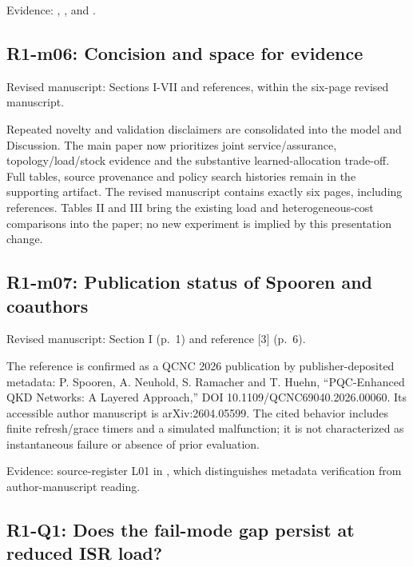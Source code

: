 Evidence: , , and .

\subsection{R1-m06: Concision and space for evidence}\label{r1-m06-concision-and-space-for-evidence}

Revised manuscript: Sections I-VII and references, within the six-page revised manuscript.

Repeated novelty and validation disclaimers are consolidated into the model and Discussion. The main paper now prioritizes joint service/assurance, topology/load/stock evidence and the substantive learned-allocation trade-off. Full tables, source provenance and policy search histories remain in the supporting artifact. The revised manuscript contains exactly six pages, including references. Tables II and III bring the existing load and heterogeneous-cost comparisons into the paper; no new experiment is implied by this presentation change.

\subsection{R1-m07: Publication status of Spooren and coauthors}\label{r1-m07-publication-status-of-spooren-and-coauthors}

Revised manuscript: Section I (p.~1) and reference {[}3{]} (p.~6).

The reference is confirmed as a QCNC 2026 publication by publisher-deposited metadata: P. Spooren, A. Neuhold, S. Ramacher and T. Huehn, ``PQC-Enhanced QKD Networks: A Layered Approach,'' DOI 10.1109/QCNC69040.2026.00060. Its accessible author manuscript is arXiv:2604.05599. The cited behavior includes finite refresh/grace timers and a simulated malfunction; it is not characterized as instantaneous failure or absence of prior evaluation.

Evidence: source-register L01 in , which distinguishes metadata verification from author-manuscript reading.

\subsection{R1-Q1: Does the fail-mode gap persist at reduced ISR load?}\label{r1-q1-does-the-fail-mode-gap-persist-at-reduced-isr-load}

